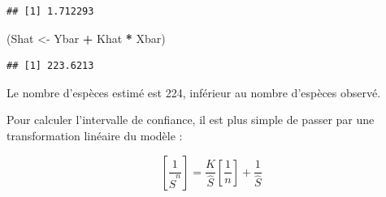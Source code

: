 \documentclass[
  11pt,
  french,
  a4paper,
  extrafontsizes,onecolumn,openright
  ]{memoir}
\newenvironment{Shaded}{\begin{snugshade}}{\end{snugshade}}
\newcommand{\CommentTok}[1]{\textcolor[rgb]{0.56,0.35,0.01}{\textit{#1}}}
\newcommand{\ControlFlowTok}[1]{\textcolor[rgb]{0.13,0.29,0.53}{\textbf{#1}}}
\newcommand{\DecValTok}[1]{\textcolor[rgb]{0.00,0.00,0.81}{#1}}
\newcommand{\FloatTok}[1]{\textcolor[rgb]{0.00,0.00,0.81}{#1}}
\newcommand{\FunctionTok}[1]{\textcolor[rgb]{0.13,0.29,0.53}{\textbf{#1}}}
\newcommand{\NormalTok}[1]{#1}
\newcommand{\OtherTok}[1]{\textcolor[rgb]{0.56,0.35,0.01}{#1}}
\newcommand{\SpecialCharTok}[1]{\textcolor[rgb]{0.81,0.36,0.00}{\textbf{#1}}}
\begin{document}
\scriptsize

\begin{Shaded}
\end{Shaded}

\begin{verbatim}
## [1] 1.712293
\end{verbatim}

\begin{Shaded}
\begin{Highlighting}[]
\NormalTok{(Shat }\OtherTok{\textless{}{-}}\NormalTok{ Ybar }\SpecialCharTok{+}\NormalTok{ Khat }\SpecialCharTok{*}\NormalTok{ Xbar)}
\end{Highlighting}
\end{Shaded}

\begin{verbatim}
## [1] 223.6213
\end{verbatim}

\normalsize

Le nombre d'espèces estimé est 224, inférieur au nombre d'espèces observé.

Pour calculer l'intervalle de confiance, il est plus simple de passer par une transformation linéaire du modèle \autocite{Lineweaver1934}:

\begin{equation}
  \label{eq:Lineweaver1934}
  \left[\frac{1}{\hat{S}^{n}}\right] = \frac{K}{\hat{S}}\left[\frac{1}{n}\right]+\frac{1}{\hat{S}} 
\end{equation}
\end{document}
